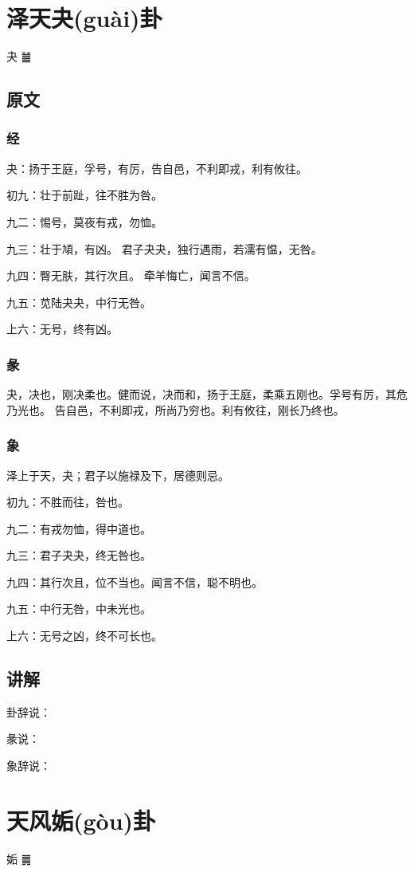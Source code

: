\documentclass[12pt,oneside]{book}
\begin{document}
\chapter{泽天夬(guài)卦}
夬 {\Large ䷪}
\section{原文}

\subsection{经}
夬：扬于王庭，孚号，有厉，告自邑，不利即戎，利有攸往。

初九：壮于前趾，往不胜为咎。

九二：惕号，莫夜有戎，勿恤。

九三：壮于頄，有凶。 君子夬夬，独行遇雨，若濡有愠，无咎。

九四：臀无肤，其行次且。 牵羊悔亡，闻言不信。

九五：苋陆夬夬，中行无咎。

上六：无号，终有凶。

\subsection{彖}
夬，决也，刚决柔也。健而说，决而和，扬于王庭，柔乘五刚也。孚号有厉，其危乃光也。 告自邑，不利即戎，所尚乃穷也。利有攸往，刚长乃终也。

\subsection{象}
泽上于天，夬；君子以施禄及下，居德则忌。

初九：不胜而往，咎也。

九二：有戎勿恤，得中道也。

九三：君子夬夬，终无咎也。

九四：其行次且，位不当也。闻言不信，聪不明也。

九五：中行无咎，中未光也。

上六：无号之凶，终不可长也。

\section{讲解}
卦辞说：

彖说：

象辞说：

\chapter{天风姤(gòu)卦}
姤 {\Large ䷫}
\end{document}
